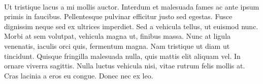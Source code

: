 \paragraph{} Ut tristique lacus a mi mollis auctor. Interdum et malesuada fames ac ante ipsum primis in faucibus. Pellentesque pulvinar efficitur justo sed egestas. Fusce dignissim neque sed ex ultrices imperdiet. Sed a vehicula tellus, ut euismod nunc. Morbi at sem volutpat, vehicula magna ut, finibus massa. Nunc at ligula venenatis, iaculis orci quis, fermentum magna. Nam tristique ut diam ut tincidunt. Quisque fringilla malesuada nulla, quis mattis elit aliquam vel. In ornare viverra sagittis. Nulla luctus vehicula nisi, vitae rutrum felis mollis at. Cras lacinia a eros eu congue. Donec nec ex leo.